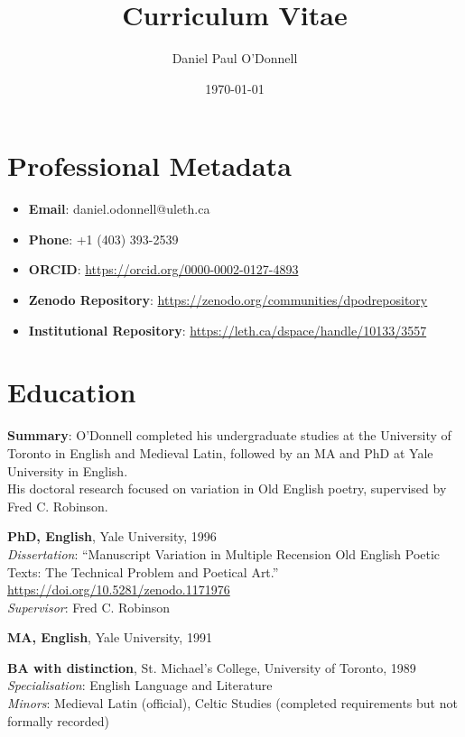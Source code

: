 \documentclass[12pt]{article}
\title{Curriculum Vitae}
\author{Daniel Paul O'Donnell}
\date{\today}
\begin{document}
\maketitle


\section*{Professional Metadata}
\begin{itemize}
  \item \textbf{Email}: daniel.odonnell@uleth.ca
  \item \textbf{Phone}: +1 (403) 393-2539
  \item \textbf{ORCID}: \url{https://orcid.org/0000-0002-0127-4893}
  \item \textbf{Zenodo Repository}: \url{https://zenodo.org/communities/dpodrepository}
  \item \textbf{Institutional Repository}: \url{https://leth.ca/dspace/handle/10133/3557}
\end{itemize}

\section*{Education}

\textbf{Summary}: O'Donnell completed his undergraduate studies at the University of Toronto in English and Medieval Latin, followed by an MA and PhD at Yale University in English.\\ His doctoral research focused on variation in Old English poetry, supervised by Fred C. Robinson.

\begin{hangparas}{1.5em}{1}
\textbf{PhD, English}, Yale University, 1996 \\
\textit{Dissertation}: “Manuscript Variation in Multiple Recension Old English Poetic Texts: The Technical Problem and Poetical Art.” \url{https://doi.org/10.5281/zenodo.1171976} \\
\textit{Supervisor}: Fred C. Robinson

\vspace{0.5em}

\textbf{MA, English}, Yale University, 1991

\vspace{0.5em}

\textbf{BA with distinction}, St. Michael’s College, University of Toronto, 1989 \\
\textit{Specialisation}: English Language and Literature \\
\textit{Minors}: Medieval Latin (official), Celtic Studies (completed requirements but not formally recorded)
\end{hangparas}
\end{document}

